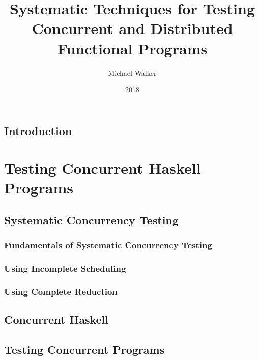 \documentclass[openright,imperial,11pt]{octavo}
\title{Systematic Techniques for Testing Concurrent and Distributed Functional Programs}
\author{Michael Walker}
\date{\todo{MONTH} 2018}
\begin{document}
\frontmatter

\pagestyle{plain}

\makeatletter\@openrightfalse\makeatother



\cleardoublepage

\mainmatter

\makeatletter\@openrighttrue\makeatother

\pagestyle{headings}

\chapter{Introduction}
\blindtext

\part{Testing Concurrent Haskell Programs}

\chapter{Systematic Concurrency Testing}
\blindtext

\section{Fundamentals of Systematic Concurrency Testing}
\blindtext

\section{Using Incomplete Scheduling}
\blindtext

\section{Using Complete Reduction}
\blindtext

\chapter{Concurrent Haskell}
\blindtext

\chapter{Testing Concurrent Programs}
\blindtext
\end{document}
